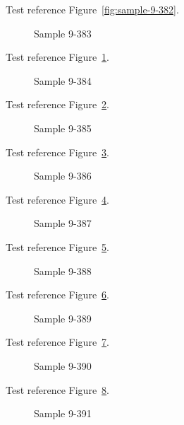 Test reference Figure~\ref{fig:sample-9-382}.

\begin{figure}[tbhp]
\caption{Sample 9-383}
\label{fig:sample-9-383}
\end{figure}

Test reference Figure~\ref{fig:sample-9-383}.

\begin{figure}[tbhp]
\caption{Sample 9-384}
\label{fig:sample-9-384}
\end{figure}

Test reference Figure~\ref{fig:sample-9-384}.

\begin{figure}[tbhp]
\caption{Sample 9-385}
\label{fig:sample-9-385}
\end{figure}

Test reference Figure~\ref{fig:sample-9-385}.

\begin{figure}[tbhp]
\caption{Sample 9-386}
\label{fig:sample-9-386}
\end{figure}

Test reference Figure~\ref{fig:sample-9-386}.

\begin{figure}[tbhp]
\caption{Sample 9-387}
\label{fig:sample-9-387}
\end{figure}

Test reference Figure~\ref{fig:sample-9-387}.

\begin{figure}[tbhp]
\caption{Sample 9-388}
\label{fig:sample-9-388}
\end{figure}

Test reference Figure~\ref{fig:sample-9-388}.

\begin{figure}[tbhp]
\caption{Sample 9-389}
\label{fig:sample-9-389}
\end{figure}

Test reference Figure~\ref{fig:sample-9-389}.

\begin{figure}[tbhp]
\caption{Sample 9-390}
\label{fig:sample-9-390}
\end{figure}

Test reference Figure~\ref{fig:sample-9-390}.

\begin{figure}[tbhp]
\caption{Sample 9-391}
\label{fig:sample-9-391}
\end{figure}

